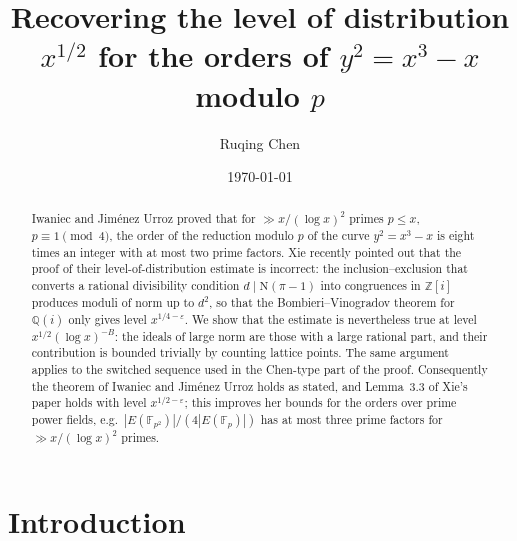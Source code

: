 \documentclass[11pt]{amsart}
\title[Level of distribution for orders of $y^2=x^3-x$ modulo $p$]{Recovering the level of distribution $x^{1/2}$ for the orders of $y^2=x^3-x$ modulo $p$}
\author{Ruqing Chen}
\date{\today}
\theoremstyle{remark}
\newcommand{\Z}{\mathbb{Z}}
\newcommand{\Q}{\mathbb{Q}}
\newcommand{\F}{\mathbb{F}}
\newcommand{\N}{\mathrm{N}}
\newcommand{\e}{\varepsilon}
\begin{document}
\begin{abstract}
Iwaniec and Jim\'enez Urroz proved that for $\gg x/(\log x)^2$ primes $p\le x$, $p\equiv 1 \pmod 4$, the order of the reduction modulo $p$ of the curve $y^2=x^3-x$ is eight times an integer with at most two prime factors. Xie recently pointed out that the proof of their level-of-distribution estimate is incorrect: the inclusion--exclusion that converts a rational divisibility condition $d\mid \N(\pi-1)$ into congruences in $\Z[i]$ produces moduli of norm up to $d^2$, so that the Bombieri--Vinogradov theorem for $\Q(i)$ only gives level $x^{1/4-\e}$. We show that the estimate is nevertheless true at level $x^{1/2}(\log x)^{-B}$: the ideals of large norm are those with a large rational part, and their contribution is bounded trivially by counting lattice points. The same argument applies to the switched sequence used in the Chen-type part of the proof. Consequently the theorem of Iwaniec and Jim\'enez Urroz holds as stated, and Lemma~3.3 of Xie's paper holds with level $x^{1/2-\e}$; this improves her bounds for the orders over prime power fields, e.g.\ $|E(\F_{p^2})|/(4|E(\F_p)|)$ has at most three prime factors for $\gg x/(\log x)^2$ primes.
\end{abstract}

\maketitle

\section{Introduction}
\end{document}
